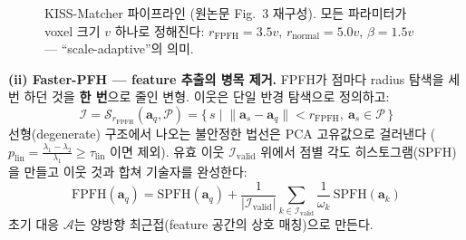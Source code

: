 \begin{figure}[htbp]
\centering
{}
\caption{KISS-Matcher 파이프라인 (원논문 Fig.~3 재구성). 모든 파라미터가
voxel 크기 $v$ 하나로 정해진다: $r_{\text{FPFH}}=3.5v$,
$r_{\text{normal}}=5.0v$, $\beta=1.5v$ --- ``scale-adaptive''의 의미.}
\label{fig:kiss-pipeline}
\end{figure}

\textbf{(ii) Faster-PFH --- feature 추출의 병목 제거.} FPFH가 점마다 radius
탐색을 세 번 하던 것을 \textbf{한 번}으로 줄인 변형. 이웃은 단일 반경
탐색으로 정의하고:
\begin{equation*}
  \mathcal{I} = \mathcal{S}_{r_{\text{FPFH}}}(\bm{a}_q, \mathcal{P})
  = \{\, s \mid \lVert \bm{a}_s - \bm{a}_q \rVert < r_{\text{FPFH}},\
  \bm{a}_s \in \mathcal{P} \,\}
  \tag{A1}
\end{equation*}
선형(degenerate) 구조에서 나오는 불안정한 법선은 PCA 고유값으로 걸러낸다
($p_{\text{lin}} = \frac{\lambda_1-\lambda_2}{\lambda_1} \ge
\tau_{\text{lin}}$ 이면 제외). 유효 이웃 $\mathcal{I}_{\text{valid}}$ 위에서
점별 각도 히스토그램(SPFH)을 만들고 이웃 것과 합쳐 기술자를 완성한다:
\begin{equation*}
  \text{FPFH}(\bm{a}_q) = \text{SPFH}(\bm{a}_q)
  + \frac{1}{\lvert \mathcal{I}_{\text{valid}}\rvert}
    \sum_{k\in\mathcal{I}_{\text{valid}}}
    \frac{1}{\omega_k}\,\text{SPFH}(\bm{a}_k)
  \tag{A5}
\end{equation*}
초기 대응 $\mathcal{A}$는 양방향 최근접(feature 공간의 상호 매칭)으로 만든다.

